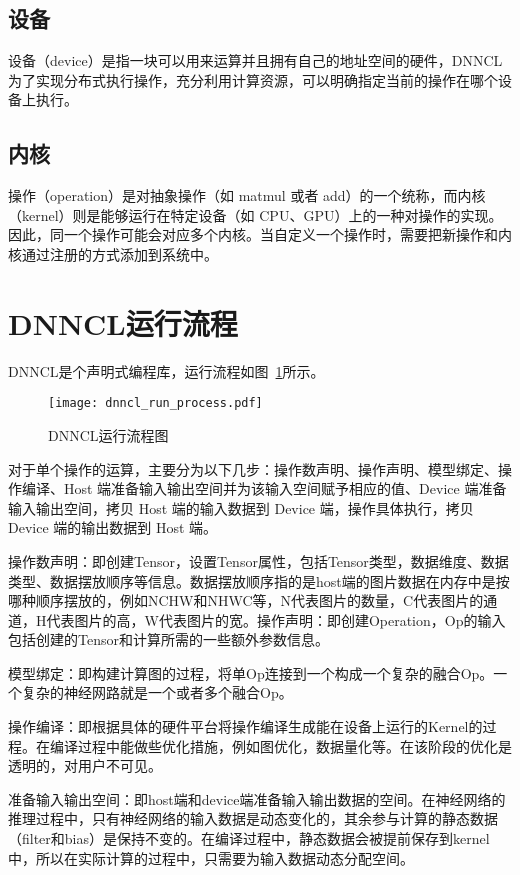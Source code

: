 \subsection {设备}
设备（device）是指一块可以用来运算并且拥有自己的地址空间的硬件，DNNCL为了实现分布式执行操作，充分利用计算资源，可以明确指定当前的操作在哪个设备上执行。

\subsection {内核}
操作（operation）是对抽象操作（如 matmul 或者 add）的一个统称，而内核（kernel）则是能够运行在特定设备（如 CPU、GPU）上的一种对操作的实现。因此，同一个操作可能会对应多个内核\cite{dong}。当自定义一个操作时，需要把新操作和内核通过注册的方式添加到系统中。

\section{DNNCL运行流程}
DNNCL是个声明式编程库，运行流程如图~\ref{fig:dnncl-run-process}所示。

\begin{figure}[htb]
  \centering
  \texttt{[image: dnncl\_run\_process.pdf]}
  \caption{DNNCL运行流程图}
  \label{fig:dnncl-run-process}
\end{figure}

对于单个操作的运算，主要分为以下几步：操作数声明、操作声明、模型绑定、操作编译、Host 端准备输入输出空间并为该输入空间赋予相应的值、Device 端准备输入输出空间，拷贝 Host 端的输入数据到 Device 端，操作具体执行，拷贝 Device 端的输出数据到 Host 端。

操作数声明：即创建Tensor，设置Tensor属性，包括Tensor类型，数据维度、数据类型、数据摆放顺序等信息。数据摆放顺序指的是host端的图片数据在内存中是按哪种顺序摆放的，例如NCHW和NHWC等，N代表图片的数量，C代表图片的通道，H代表图片的高，W代表图片的宽。操作声明：即创建Operation，Op的输入包括创建的Tensor和计算所需的一些额外参数信息。

模型绑定：即构建计算图的过程，将单Op连接到一个构成一个复杂的融合Op。一个复杂的神经网路就是一个或者多个融合Op。

操作编译：即根据具体的硬件平台将操作编译生成能在设备上运行的Kernel的过程。在编译过程中能做些优化措施，例如图优化，数据量化等。在该阶段的优化是透明的，对用户不可见。

准备输入输出空间：即host端和device端准备输入输出数据的空间。在神经网络的推理过程中，只有神经网络的输入数据是动态变化的，其余参与计算的静态数据（filter和bias）是保持不变的。在编译过程中，静态数据会被提前保存到kernel中，所以在实际计算的过程中，只需要为输入数据动态分配空间。

